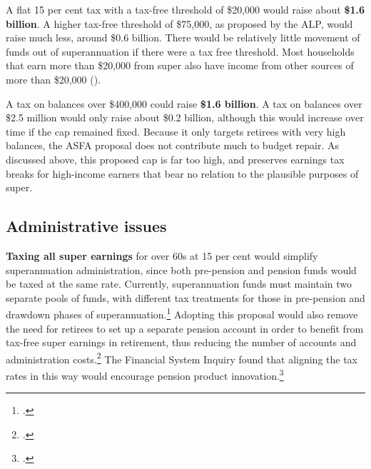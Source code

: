 A flat 15 per cent tax with a tax-free threshold of \$20,000 would raise about \textbf{\$1.6 billion}. A higher tax-free threshold of \$75,000, as proposed by the ALP, would raise much less, around \$0.6 billion. There would be relatively little movement of funds out of superannuation if there were a tax free threshold. Most households that earn more than \$20,000 from super also have income from other sources of more than \$20,000 ().

A tax on balances over \$400,000 could raise \textbf{\$1.6 billion}.  A tax on balances over \$2.5 million would only raise about \$0.2 billion, although this would increase over time if the cap remained fixed. Because it only targets retirees with very high balances, the ASFA proposal does not contribute much to budget repair. As discussed above, this proposed cap is far too high, and preserves earnings tax breaks for high-income earners that bear no relation to the plausible purposes of super.

\subsection{Administrative issues}
\textbf{Taxing all super earnings} for over 60s at 15 per cent would simplify superannuation administration, since both pre-pension and pension funds would be taxed at the same rate. Currently, superannuation funds must maintain two separate pools of funds, with different tax treatments for those in pre-pension and drawdown phases of superannuation.\footcite[][44]{FinancialSystemsInquiry2015}  Adopting this proposal would also remove the need for retirees to set up a separate pension account in order to benefit from tax-free super earnings in retirement, thus reducing the number of accounts and administration costs.\footcite{RiceWarner2015SubmissionTaxWhitePaper}  The Financial System Inquiry found that aligning the tax rates in this way would encourage pension product innovation.\footcite[][139]{FinancialSystemsInquiry2015} 

